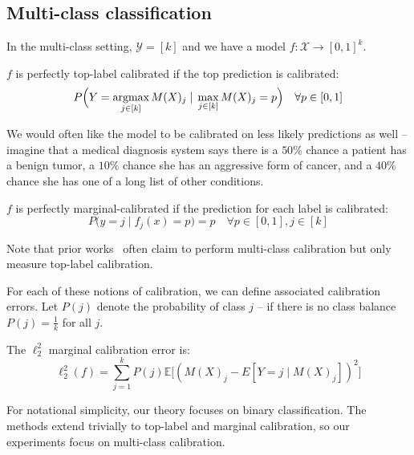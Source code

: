 \subsection{Multi-class classification}

In the multi-class setting, $\mathcal{Y} = [k]$ and we have a model $f : \mathcal{X} \to [0, 1]^k$.

\begin{definition}
$f$ is perfectly top-label calibrated if the top prediction is calibrated:
\[ P\Big(Y = \mathop{\mbox{argmax}}_{j \in [k]} M(X)_j \; | \; \max_{j \in [k]} M(X)_j = p\Big) \quad \forall p \in [0, 1] \]
\end{definition}

We would often like the model to be calibrated on less likely predictions as well -- imagine that a medical diagnosis system says there is a $50\%$ chance a patient has a benign tumor, a $10\%$ chance she has an aggressive form of cancer, and a $40\%$ chance she has one of a long list of other conditions.

\begin{definition}
$f$ is perfectly marginal-calibrated if the prediction for each label is calibrated:
\[ P\Big(y = j \; | \; f_j(x) = p\Big) = p \quad \forall p \in [0, 1], j \in [k] \]
\end{definition}

Note that prior works~\cite{guo2017calibration, hendrycks2019anomaly, hendrycks2019pretraining} often claim to perform multi-class calibration but only measure top-label calibration.

For each of these notions of calibration, we can define associated calibration errors.
Let $P(j)$ denote the probability of class $j$ -- if there is no class balance $P(j) = \frac{1}{k}$ for all $j$.

\begin{definition}
The $\ell_2^2$ marginal calibration error is:
\[ \ell_2^2(f) = \sum_{j = 1}^k P(j) \mathbb{E}\big[ (M(X)_j - E[Y = j \; | \; M(X)_j])^2 \big] \]
\end{definition}

For notational simplicity, our theory focuses on binary classification.
The methods extend trivially to top-label and marginal calibration, so our experiments focus on multi-class calibration.


